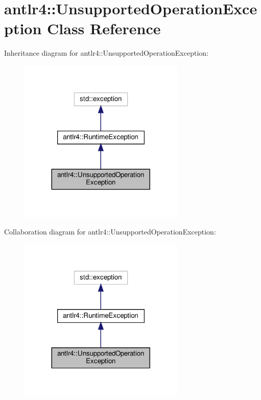 \hypertarget{classantlr4_1_1UnsupportedOperationException}{}\section{antlr4\+:\+:Unsupported\+Operation\+Exception Class Reference}
\label{classantlr4_1_1UnsupportedOperationException}


Inheritance diagram for antlr4\+:\+:Unsupported\+Operation\+Exception\+:
\nopagebreak
\begin{figure}[H]
\begin{center}
\leavevmode
\includegraphics[width=224pt]{classantlr4_1_1UnsupportedOperationException__inherit__graph}
\end{center}
\end{figure}


Collaboration diagram for antlr4\+:\+:Unsupported\+Operation\+Exception\+:
\nopagebreak
\begin{figure}[H]
\begin{center}
\leavevmode
\includegraphics[width=224pt]{classantlr4_1_1UnsupportedOperationException__coll__graph}
\end{center}
\end{figure}
